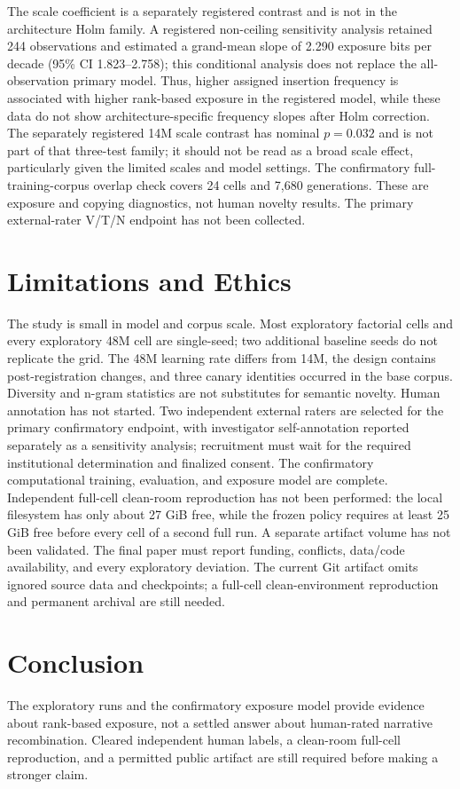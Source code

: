 \documentclass[conference]{IEEEtran}
\begin{document}
The scale coefficient is a separately registered contrast and is not in the architecture Holm family. A registered
non-ceiling sensitivity analysis retained 244 observations and estimated a grand-mean slope of 2.290 exposure bits
per decade (95\% CI 1.823--2.758); this conditional analysis does not replace the all-observation primary model.
Thus, higher assigned insertion frequency is associated with higher rank-based exposure in the registered model,
while these data do not show architecture-specific frequency slopes after Holm correction. The separately
registered 14M scale contrast has nominal $p=0.032$ and is not part of that three-test family; it should not be
read as a broad scale effect, particularly given the limited scales and model settings.
The confirmatory full-training-corpus overlap check covers 24 cells and 7,680 generations. These are exposure and
copying diagnostics, not human novelty results. The primary external-rater V/T/N endpoint has not been collected.

\section{Limitations and Ethics}
The study is small in model and corpus scale. Most exploratory factorial cells and every exploratory 48M cell are single-seed; two
additional baseline seeds do not replicate the grid. The 48M learning rate differs from 14M, the design contains
post-registration changes, and three canary identities occurred in the base corpus. Diversity and n-gram
statistics are not substitutes for semantic novelty. Human annotation has not started. Two independent external
raters are selected for the primary confirmatory endpoint, with investigator self-annotation reported separately
as a sensitivity analysis; recruitment must wait for the required institutional determination and finalized
consent. The confirmatory computational training, evaluation, and exposure model are complete. Independent
full-cell clean-room reproduction has not been performed: the local filesystem has only about 27 GiB free, while
the frozen policy requires at least 25 GiB free before every cell of a second full run. A separate artifact volume
has not been validated. The final paper must report funding, conflicts,
data/code availability, and every exploratory deviation. The current Git artifact omits ignored source data and
checkpoints; a full-cell clean-environment reproduction and permanent archival are still needed.

\section{Conclusion}
The exploratory runs and the confirmatory exposure model provide evidence about rank-based exposure, not a settled
answer about human-rated narrative recombination. Cleared independent human labels, a clean-room full-cell
reproduction, and a permitted public artifact are still required before making a stronger claim.
\end{document}

